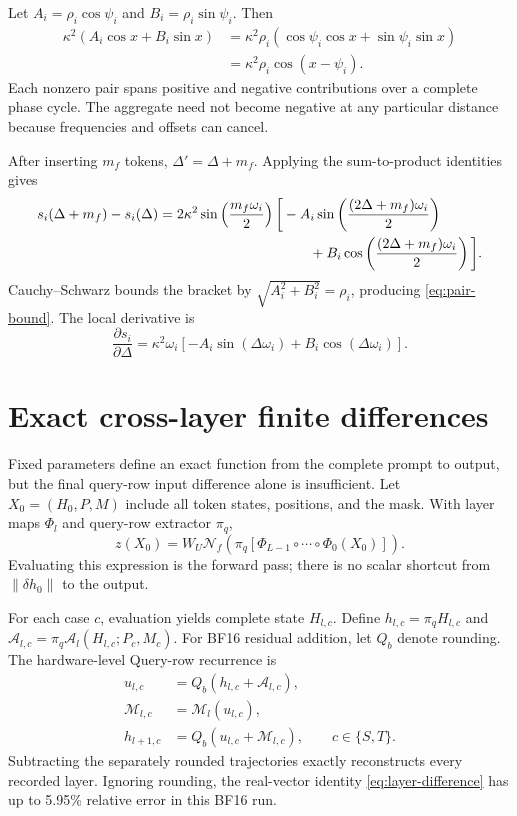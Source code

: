 Let $A_i=\rho_i\cos\psi_i$ and $B_i=\rho_i\sin\psi_i$.  Then
\begin{align}
  \kappa^2(A_i\cos x+B_i\sin x)
  &=\kappa^2\rho_i(\cos\psi_i\cos x+\sin\psi_i\sin x)\\
  &=\kappa^2\rho_i\cos(x-\psi_i).
\end{align}
Each nonzero pair spans positive and negative contributions over a complete
phase cycle.  The aggregate need not become negative at any particular
distance because frequencies and offsets can cancel.

After inserting $m_f$ tokens, $\Delta'=\Delta+m_f$.  Applying the sum-to-product
identities gives
\begin{align}
  s_i(\Delta+m_f)-s_i(\Delta)
  &=2\kappa^2\sin\left(\frac{m_f\omega_i}{2}\right)
  \bigg[
  -A_i\sin\left(\frac{(2\Delta+m_f)\omega_i}{2}\right)\\
  &\hspace{38mm}+B_i\cos\left(\frac{(2\Delta+m_f)\omega_i}{2}\right)
  \bigg].
\end{align}
Cauchy--Schwarz bounds the bracket by $\sqrt{A_i^2+B_i^2}=\rho_i$, producing
\cref{eq:pair-bound}.  The local derivative is
\begin{equation}
  \frac{\partial s_i}{\partial\Delta}
  =\kappa^2\omega_i[-A_i\sin(\Delta\omega_i)+B_i\cos(\Delta\omega_i)].
\end{equation}

\section{Exact cross-layer finite differences}
\label{app:layerwise}

Fixed parameters define an exact function from the complete prompt to output,
but the final query-row input difference alone is insufficient.  Let
$X_0=(H_0,P,M)$ include all token states, positions, and the mask.  With layer
maps $\Phi_l$ and query-row extractor $\pi_q$,
\begin{equation}
  z(X_0)=W_U\mathcal N_f\left(
  \pi_q[\Phi_{L-1}\circ\cdots\circ\Phi_0(X_0)]\right).
\end{equation}
Evaluating this expression is the forward pass; there is no scalar shortcut
from $\|\delta h_0\|$ to the output.

For each case $c$, evaluation yields complete state $H_{l,c}$.  Define
$h_{l,c}=\pi_qH_{l,c}$ and
$\mathcal A_{l,c}=\pi_q\mathcal A_l(H_{l,c};P_c,M_c)$.  For BF16 residual
addition, let $Q_b$ denote rounding.  The hardware-level Query-row recurrence is
\begin{align}
  u_{l,c}&=Q_b(h_{l,c}+\mathcal A_{l,c}),\\
  \mathcal M_{l,c}&=\mathcal M_l(u_{l,c}),\\
  h_{l+1,c}&=Q_b(u_{l,c}+\mathcal M_{l,c}),\qquad c\in\{S,T\}.
\end{align}
Subtracting the separately rounded trajectories exactly reconstructs every
recorded layer.  Ignoring rounding, the real-vector identity
\cref{eq:layer-difference} has up to 5.95\% relative error in this BF16 run.


